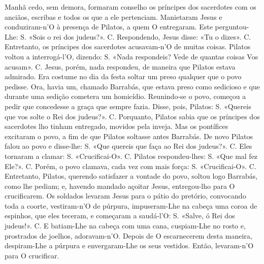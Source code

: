 \begin{paracol}{2}
{Manhã cedo, sem demora, formaram conselho os príncipes dos sacerdotes com os anciãos, escribas e todos os que a ele pertenciam. Manietaram Jesus e conduziram-n’O à presença de Pilatos, a quem O entregaram. Este perguntou-Lhe: {\redx S.} «Sois o rei dos judeus?». {\redx C.} Respondendo, Jesus disse: \cruz «Tu o dizes». {\redx C.} Entretanto, os príncipes dos sacerdotes acusavam-n’O de muitas coisas. Pilatos voltou a interrogá-l’O, dizendo: {\redx S.} «Nada respondeis? Vede de quantas coisas Vos acusam». {\redx C.} Jesus, porém, nada respondeu, de maneira que Pilatos estava admirado. Era costume no dia da festa soltar um preso qualquer que o povo pedisse. Ora, havia um, chamado Barrabás, que estava preso como sedicioso e que durante uma sedição cometera um homicídio. Reunindo-se o povo, começou a pedir que concedesse a graça que sempre fazia. Disse, pois, Pilatos: {\redx S.} «Quereis que vos solte o Rei dos judeus?». {\redx C.} Porquanto, Pilatos sabia que os príncipes dos sacerdotes lho tinham entregado, movidos pela inveja. Mas os pontífices excitaram o povo, a fim de que Pilatos soltasse antes Barrabás. De novo Pilatos falou ao povo e disse-lhe: {\redx S.} «Que quereis que faça ao Rei dos judeus?». {\redx C.} Eles tornaram a clamar: {\redx S.} «Crucificai-O». {\redx C.} Pilatos respondeu-lhes: {\redx S.} «Que mal fez Ele?». {\redx C.} Porém, o povo clamava, cada vez com mais força: {\redx S.} «Crucificai-O». {\redx C.} Entretanto, Pilatos, querendo satisfazer a vontade do povo, soltou logo Barrabás, como lhe pediam; e, havendo mandado açoitar Jesus, entregou-lho para O crucificarem. Os soldados levaram Jesus para o pátio do pretório, convocando toda a coorte, vestiram-n’O de púrpura, impuseram-Lhe na cabeça uma coroa de espinhos, que eles teceram, e começaram a saudá-l’O: {\redx S.} «Salve, ó Rei dos judeus!». {\redx C.} E batiam-Lhe na cabeça com uma cana, cuspiam-Lhe no rosto e, prostrados de joelhos, adoravam-n’O. Depois de O escarnecerem desta maneira, despiram-Lhe a púrpura e envergaram-Lhe os seus vestidos. Então, levaram-n’O para O crucificar.
}\switchcolumn*{}
\end{paracol}
